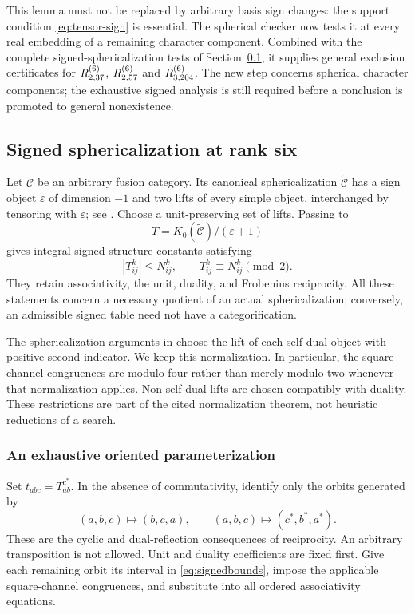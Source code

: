 This lemma must not be replaced by arbitrary basis sign changes: the
support condition \eqref{eq:tensor-sign} is essential. The spherical
checker now tests it at every real embedding of a remaining character
component. Combined with the complete signed-sphericalization tests of Section~\ref{sec:signed}, it supplies general exclusion certificates
for $R^{(6)}_{2,37}$, $R^{(6)}_{2,57}$ and $R^{(6)}_{3,204}$. The new step concerns
spherical character components; the exhaustive signed analysis is still
required before a conclusion is promoted to general nonexistence.

\subsection{Signed sphericalization at rank six}\label{sec:signed}
Let $\mathcal C$ be an arbitrary fusion category. Its canonical
sphericalization $\widetilde{\mathcal C}$ has a sign object
$\varepsilon$ of dimension $-1$ and two lifts of every simple object,
interchanged by tensoring with $\varepsilon$; see
\cite{ENO,Ostrik3}. Choose a unit-preserving set of lifts. Passing to
\[
T=K_0(\widetilde{\mathcal C})/(\varepsilon+1)
\]
gives integral signed structure constants satisfying
\begin{equation}\label{eq:signedbounds}
 |T_{ij}^{k}|\le N_{ij}^{k},\qquad
 T_{ij}^{k}\equiv N_{ij}^{k}\pmod2.
\end{equation}
They retain associativity, the unit, duality, and Frobenius reciprocity.
All these statements concern a necessary quotient of an actual
sphericalization; conversely, an admissible signed table need not have a
categorification.

The sphericalization arguments in \cite{DP4,DP5} choose the lift of each
self-dual object with positive second indicator. We keep this normalization.
In particular, the square-channel congruences are modulo four rather
than merely modulo two whenever that normalization applies. Non-self-dual
lifts are chosen compatibly with duality. These restrictions are part of
the cited normalization theorem, not heuristic reductions of a search.

\subsubsection{An exhaustive oriented parameterization}
Set $t_{abc}=T_{ab}^{c^*}$. In the absence of commutativity, identify
only the orbits generated by
\begin{equation}\label{eq:orbits}
(a,b,c)\longmapsto(b,c,a),\qquad
(a,b,c)\longmapsto(c^*,b^*,a^*).
\end{equation}
These are the cyclic and dual-reflection consequences of reciprocity.
An arbitrary transposition is not allowed. Unit and duality coefficients
are fixed first. Give each remaining orbit its interval in
\eqref{eq:signedbounds}, impose the applicable square-channel
congruences, and substitute into all ordered associativity equations.

